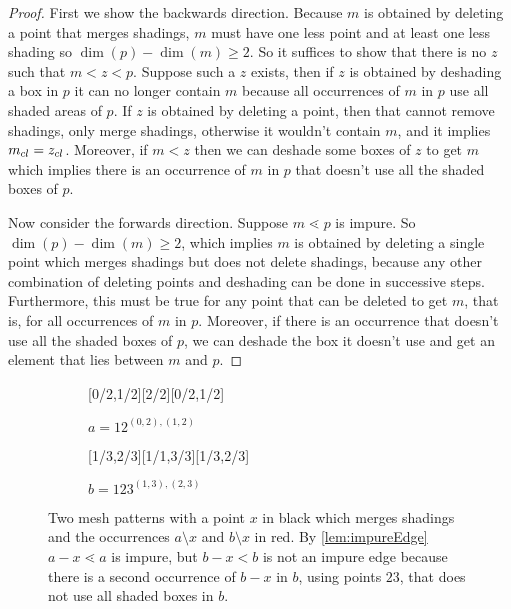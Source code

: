 \documentclass[11pt,a4paper,oneside]{article}
\begin{document}
\begin{proof}
First we show the backwards direction. Because $m$ is obtained by deleting a
point that merges shadings, $m$ must have one less point and at least one less
shading so $\dim(p)-\dim(m)\ge2$. So it suffices to show that there is no $z$ such
that $m<z<p$. Suppose such a $z$ exists, then if $z$ is obtained by deshading a
box in $p$ it can no longer contain $m$ because all occurrences of $m$ in $p$
use all shaded areas of $p$. If $z$ is obtained by deleting a point, then that
cannot remove shadings, only merge shadings, otherwise it wouldn't contain $m$,
and it implies $m_{cl}=z_{cl}$. Moreover, if $m<z$ then we can deshade some boxes
of $z$ to get $m$ which implies there is an occurrence of $m$ in $p$ that
doesn't use all the shaded boxes of $p$.

Now consider the forwards direction. Suppose $m\lessdot p$ is impure. So
$\dim(p)-\dim(m)\ge2$, which implies $m$ is obtained by deleting a single point
which merges shadings but does not delete shadings, because any other
combination of deleting points and deshading can be done in successive steps.
Furthermore, this must be true for any point that can be deleted to get $m$,
that is, for all occurrences of $m$ in $p$. Moreover, if there is an occurrence
that doesn't use all the shaded boxes of $p$, we can deshade the box it doesn't
use and get an element that lies between $m$ and $p$.
\end{proof}

\begin{figure}\centering
\begin{subfigure}[b]{0.3\textwidth}
\centering{}[0/2,1/2][2/2][0/2,1/2]
\caption*{$a=12^{(0,2),(1,2)}$}\label{subfig:a}\end{subfigure}
\begin{subfigure}[b]{0.3\textwidth}
\centering{}[1/3,2/3][1/1,3/3][1/3,2/3]
\caption*{$b=123^{(1,3),(2,3)}$}\label{subfig:b}\end{subfigure}
\caption{Two mesh patterns with a point $x$ in black which merges shadings and the occurrences
$a\setminus x$ and $b\setminus x$ in red. By \cref{lem:impureEdge} $a-x\lessdot a$ is impure,
but $b-x<b$ is not an impure edge because there is a second occurrence of $b-x$ in $b$, using points $23$,
that does not use all shaded boxes in $b$.}\label{fig:impEx}
\end{figure}
\end{document}
